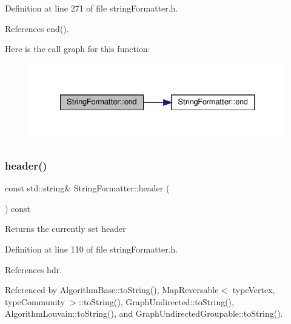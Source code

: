 Definition at line 271 of file string\+Formatter.\+h.



References end().

Here is the call graph for this function\+:
\nopagebreak
\begin{figure}[H]
\begin{center}
\leavevmode
\includegraphics[width=328pt]{classStringFormatter_ae06dd9b27922820923fa323702f4111c_cgraph}
\end{center}
\end{figure}
\mbox{\label{classStringFormatter_ab4fb73dc094c5ee247606a64194136c5}} 
\subsubsection{\texorpdfstring{header()}{header()}\hspace{0.1cm}{\footnotesize\ttfamily [1/2]}}
{\footnotesize\ttfamily const std\+::string\& String\+Formatter\+::header (\begin{DoxyParamCaption}{ }\end{DoxyParamCaption}) const\hspace{0.3cm}{\ttfamily [inline]}}

\begin{DoxyReturn}{Returns}
the currently set header 
\end{DoxyReturn}


Definition at line 110 of file string\+Formatter.\+h.



References hdr.



Referenced by Algorithm\+Base\+::to\+String(), Map\+Reversable$<$ type\+Vertex, type\+Community $>$\+::to\+String(), Graph\+Undirected\+::to\+String(), Algorithm\+Louvain\+::to\+String(), and Graph\+Undirected\+Groupable\+::to\+String().

\mbox{\label{classStringFormatter_a03df224c2ed00ef8b01d6e8f4b65136b}} 
